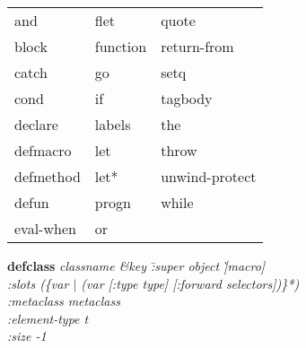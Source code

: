 {\newpage
\clearpage
\samepage 
}

{\newpage
\clearpage
\samepage 
\begin{table}\begin{center}
{\large
\begin{tabular}{|l l l|} \hline 
and & flet & quote \\ 
block & function & return-from\\ 
catch & go & setq \\ 
cond & if & tagbody \\ 
declare & labels & the \\ 
defmacro & let & throw \\ 
defmethod & let* & unwind-protect \\ 
defun & progn & while \\ 
eval-when & or & \\ 
\hline
\end{tabular} }
\end{center}

\end{table}
}

{\newpage
\clearpage
\samepage 
}

{\newpage
\clearpage
\samepage 
}

{\newpage
\clearpage
\samepage 
\begin{emtabbing}{\bf defclass} 
\it classname \&key \= :super object \` [macro] \\  
\> :slots (\{var $|$ (var [:type type] [:forward selectors])\}*) \\  
\> :metaclass metaclass \\  
\> :element-type t \\  
\> :size -1\\  
\rm
\end{emtabbing}
}

